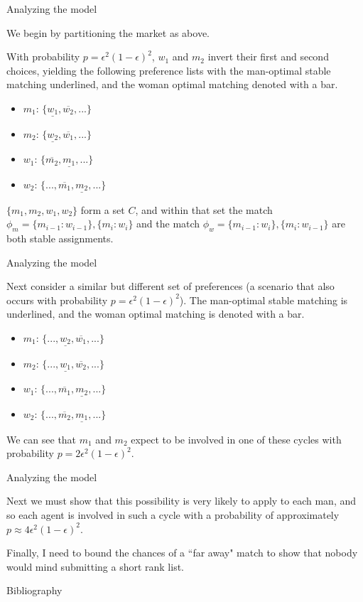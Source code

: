 \documentclass{beamer}
\begin{document}
\begin{frame}{Analyzing the model}

We begin by partitioning the market as above. 

With probability $p= \epsilon^2(1-\epsilon)^2$, $w_1$ and $m_2$ invert their first and second choices, yielding the following preference lists with the man-optimal stable matching  underlined, and the woman optimal matching denoted with a bar.
\begin{itemize}
	\item $m_{1}$: $\{\underline{w_{1}}, \overline{w_2}, ...\}$
	\item $m_2$: $\{ \underline{w_2}, \overline{w_{1}},...\}$
	\item $w_{1}$: $\{\overline{m_2}, \underline{m_{1}},...\}$
	\item $w_2$: $\{...,\overline{m_{1}}, \underline{m_2},...\}$
\end{itemize} 
$\{m_1, m_{2},w_1, w_{2}\}$ form a set $C$, and within that set the match $\phi_m = \{m_{i-1}:w_{i-1}\},\{m_i:w_i\}$ and the match $\phi_w = \{m_{i-1}:w_{i}\},\{m_i:w_{i-1}\}$ are both stable assignments.   


\end{frame}
\begin{frame}{Analyzing the model}
	

Next consider a similar but different set of preferences (a scenario that also occurs with probability $p= \epsilon^2(1-\epsilon)^2$).  The man-optimal stable matching is underlined, and the woman optimal matching is denoted with a bar.

\begin{itemize}
	\item $m_1$: $\{...,\underline{w_{2}}, \overline{w_{1}},...\}$
	\item $m_{2}$: $\{...,\underline{w_{1}}, \overline{w_{2}}, ...\}$
	\item $w_{1}$: $\{...,\overline{m_1},\underline{m_{2}}, ...\}$
	\item $w_{2}$: $\{...,\overline{m_{2}}, \underline{m_1},...\}$
	
	
\end{itemize} 



We can see that $m_1$ and $m_2$ expect to be involved in one of these cycles with probability $p= 2\epsilon^2(1-\epsilon)^2$.
\end{frame}
\begin{frame}{Analyzing the model}
	
	
	
Next we must show that this possibility is very likely to apply to each man, and so each agent is involved in such a cycle with a probability of approximately $p \approx 4\epsilon^2(1-\epsilon)^2$.


Finally, I need to bound the chances of a ``far away" match to show that nobody would mind submitting a short rank list.

\end{frame}

\begin{frame}{Bibliography}


\end{frame}
\end{document}
